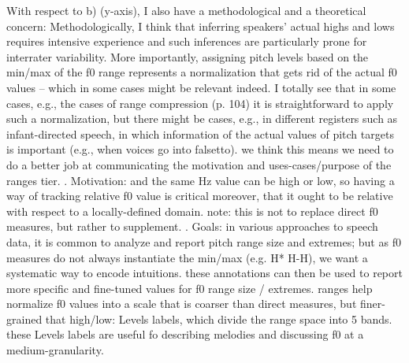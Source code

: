 \markdownRendererUlEndTight \markdownRendererUlItemEnd 
\markdownRendererUlEndTight \markdownRendererUlItemEnd 
\markdownRendererUlEndTight \markdownRendererUlItemEnd 
\markdownRendererUlEndTight \markdownRendererUlItemEnd 
\markdownRendererUlItem With respect to b) (y-axis), I also have a methodological and a theoretical concern: Methodologically, I think that inferring speakers’ actual highs and lows requires intensive experience and such inferences are particularly prone for interrater variability. More importantly, assigning pitch levels based on the min/max of the f0 range represents a normalization that gets rid of the actual f0 values – which in some cases might be relevant indeed. I totally see that in some cases, e.g., the cases of range compression (p. 104) it is straightforward to apply such a normalization, but there might be cases, e.g., in different registers such as infant-directed speech, in which information of the actual values of pitch targets is important (e.g., when voices go into falsetto).\markdownRendererUlItemEnd 
\markdownRendererUlItem we think this means we need to do a better job at communicating the motivation and uses-cases/purpose of the ranges tier.\markdownRendererInterblockSeparator
{}\markdownRendererUlBeginTight
{}. Motivation:\markdownRendererInterblockSeparator
{}\markdownRendererUlBeginTight
{} and the same Hz value can be high or low, so having a way of tracking relative f0 value is critical\markdownRendererUlItemEnd 
\markdownRendererUlItem moreover, that it ought to be relative with respect to a locally-defined domain.\markdownRendererUlItemEnd 
\markdownRendererUlItem note: this is not to replace direct f0 measures, but rather to supplement.\markdownRendererUlItemEnd 
\markdownRendererUlEndTight \markdownRendererUlItemEnd 
{}. Goals:\markdownRendererInterblockSeparator
{}\markdownRendererUlBeginTight
\markdownRendererUlItem in various approaches to speech data, it is common to analyze and report pitch range size and extremes; but as f0 measures do not always instantiate the min/max (e.g. H* H-H\markdownRendererPercentSign{}), we want a systematic way to encode intuitions. these annotations can then be used to report more specific and fine-tuned values for f0 range size / extremes.\markdownRendererUlItemEnd 
\markdownRendererUlItem ranges help normalize f0 values into a scale that is coarser than direct measures, but finer-grained that high/low: Levels labels, which divide the range space into 5 bands. these Levels labels are useful fo describing melodies and discussing f0 at a medium-granularity.\markdownRendererInterblockSeparator
